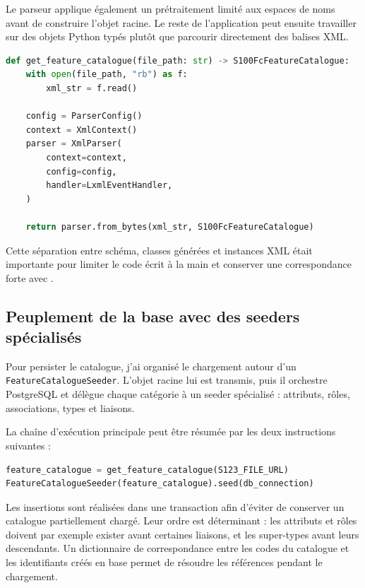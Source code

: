 Le parseur applique également un prétraitement limité aux espaces de noms avant de construire l'objet racine. Le reste de l'application peut ensuite travailler sur des objets Python typés plutôt que parcourir directement des balises XML.

\begin{lstlisting}[language=Python,caption={Parsing d'un Feature Catalogue en objet Python},label={lst:s123-parser}]
def get_feature_catalogue(file_path: str) -> S100FcFeatureCatalogue:
    with open(file_path, "rb") as f:
        xml_str = f.read()

    config = ParserConfig()
    context = XmlContext()
    parser = XmlParser(
        context=context,
        config=config,
        handler=LxmlEventHandler,
    )

    return parser.from_bytes(xml_str, S100FcFeatureCatalogue)
\end{lstlisting}

Cette séparation entre schéma, classes générées et instances XML était importante pour limiter le code écrit à la main et conserver une correspondance forte avec .

\subsection{Peuplement de la base avec des seeders spécialisés}

Pour persister le catalogue, j'ai organisé le chargement autour d'un \texttt{FeatureCatalogueSeeder}. L'objet racine lui est transmis, puis il orchestre PostgreSQL et délègue chaque catégorie à un seeder spécialisé : attributs, rôles, associations, types et liaisons.

La chaîne d'exécution principale peut être résumée par les deux instructions suivantes :

\begin{lstlisting}[language=Python,caption={Enchaînement du parser et du seeder},label={lst:s123-parser-seeder}]
feature_catalogue = get_feature_catalogue(S123_FILE_URL)
FeatureCatalogueSeeder(feature_catalogue).seed(db_connection)
\end{lstlisting}

Les insertions sont réalisées dans une transaction afin d'éviter de conserver un catalogue partiellement chargé. Leur ordre est déterminant : les attributs et rôles doivent par exemple exister avant certaines liaisons, et les super-types avant leurs descendants. Un dictionnaire de correspondance entre les codes du catalogue et les identifiants créés en base permet de résoudre les références pendant le chargement.

